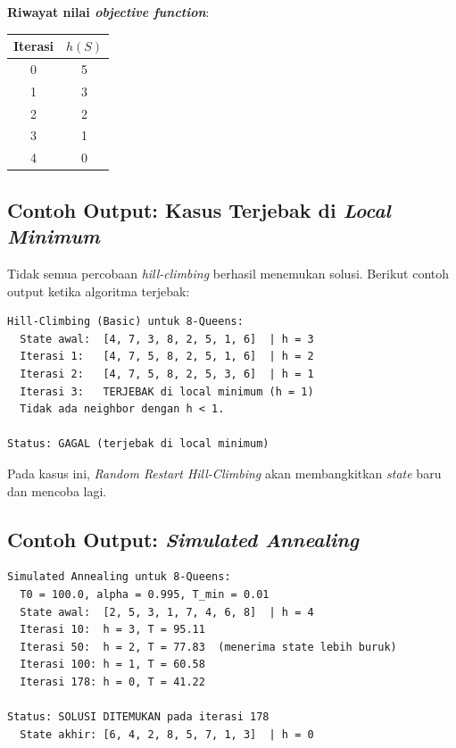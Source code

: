 \documentclass[12pt,a4paper]{article}
\begin{document}
\textbf{Riwayat nilai \textit{objective function}}:
\begin{center}
\begin{tabular}{cc}
\toprule
\textbf{Iterasi} & \textbf{$h(S)$} \\
\midrule
0 & 5 \\
1 & 3 \\
2 & 2 \\
3 & 1 \\
4 & 0 \\
\bottomrule
\end{tabular}
\end{center}

\subsection{Contoh Output: Kasus Terjebak di \textit{Local Minimum}}
\label{subsec:contoh-stuck}

Tidak semua percobaan \textit{hill-climbing} berhasil menemukan solusi. Berikut contoh output ketika algoritma terjebak:

\begin{lstlisting}[language={}, basicstyle=\ttfamily\small, frame=single, caption={Contoh output ketika terjebak di \textit{local minimum}.}]
Hill-Climbing (Basic) untuk 8-Queens:
  State awal:  [4, 7, 3, 8, 2, 5, 1, 6]  | h = 3
  Iterasi 1:   [4, 7, 5, 8, 2, 5, 1, 6]  | h = 2
  Iterasi 2:   [4, 7, 5, 8, 2, 5, 3, 6]  | h = 1
  Iterasi 3:   TERJEBAK di local minimum (h = 1)
  Tidak ada neighbor dengan h < 1.

Status: GAGAL (terjebak di local minimum)
\end{lstlisting}

Pada kasus ini, \textit{Random Restart Hill-Climbing} akan membangkitkan \textit{state} baru dan mencoba lagi.

\subsection{Contoh Output: \textit{Simulated Annealing}}
\label{subsec:contoh-sa}

\begin{lstlisting}[language={}, basicstyle=\ttfamily\small, frame=single, caption={Contoh output \textit{Simulated Annealing}.}]
Simulated Annealing untuk 8-Queens:
  T0 = 100.0, alpha = 0.995, T_min = 0.01
  State awal:  [2, 5, 3, 1, 7, 4, 6, 8]  | h = 4
  Iterasi 10:  h = 3, T = 95.11
  Iterasi 50:  h = 2, T = 77.83  (menerima state lebih buruk)
  Iterasi 100: h = 1, T = 60.58
  Iterasi 178: h = 0, T = 41.22

Status: SOLUSI DITEMUKAN pada iterasi 178
  State akhir: [6, 4, 2, 8, 5, 7, 1, 3]  | h = 0
\end{lstlisting}
\end{document}
